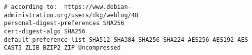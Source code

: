\begin{lstlisting}[breaklines]
# according to:  https://www.debian-administration.org/users/dkg/weblog/48
personal-digest-preferences SHA256
cert-digest-algo SHA256
default-preference-list SHA512 SHA384 SHA256 SHA224 AES256 AES192 AES CAST5 ZLIB BZIP2 ZIP Uncompressed
\end{lstlisting}












